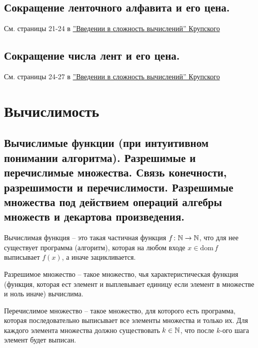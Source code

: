 \documentclass[a4paper, 10pt]{article}
\newcommand{\dom}{\text{dom}\,}
\begin{document}
\subsection{Сокращение ленточного алфавита и его цена.}

См. страницы 21-24 в \href{https://static42.fileskachat.com/download/6/c/33377_672968aac1311878215538743df4fbd9.pdf}{''Введении в сложность вычислений'' Крупского}

\subsection{Сокращение числа лент и его цена.}

См. страницы 24-27 в \href{https://static42.fileskachat.com/download/6/c/33377_672968aac1311878215538743df4fbd9.pdf}{''Введении в сложность вычислений'' Крупского}

\section{Вычислимость}

\subsection{Вычислимые функции (при интуитивном понимании алгоритма). Разрешимые и перечислимые множества. Связь конечности, разрешимости и перечислимости. Разрешимые множества под действием операций алгебры множеств и декартова произведения.}

Вычислимая функция -- это такая частичная функция $f\colon\mathbb{N}\to\mathbb{N}$, что для нее существует программа (алгоритм), которая на любом входе $x\in\dom f$ выписывает $f(x)$, а иначе зацикливается.

Разрешимое множество -- такое множество, чья характеристическая функция (функция, которая ест элемент и выплевывает единицу если элемент в множестве и ноль иначе) вычислима.

Перечислимое множество -- такое множество, для которого есть программа, которая последовательно выписывает все элементы множества и только их. Для каждого элемента множества должно существовать $k\in\mathbb{N}$, что после $k$-ого шага элемент будет выписан.

\hfill
\end{document}
